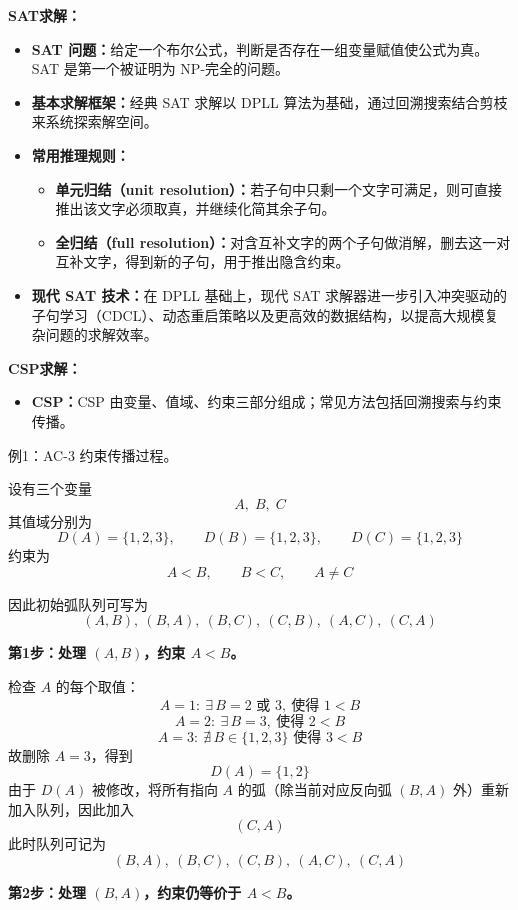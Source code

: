 \documentclass[../main.tex]{subfiles}
\begin{document}
\begin{enumerate}
\begin{itemize}
        \textbf{SAT求解：}
            \begin{itemize}
            \item \textbf{SAT 问题：}给定一个布尔公式，判断是否存在一组变量赋值使公式为真。SAT 是第一个被证明为 NP-完全的问题。
            \item \textbf{基本求解框架：}经典 SAT 求解以 DPLL 算法为基础，通过回溯搜索结合剪枝来系统探索解空间。
            \item \textbf{常用推理规则：}
            \begin{itemize}
                \item \textbf{单元归结（unit resolution）：}若子句中只剩一个文字可满足，则可直接推出该文字必须取真，并继续化简其余子句。
                \item \textbf{全归结（full resolution）：}对含互补文字的两个子句做消解，删去这一对互补文字，得到新的子句，用于推出隐含约束。
            \end{itemize}
            \item \textbf{现代 SAT 技术：}在 DPLL 基础上，现代 SAT 求解器进一步引入冲突驱动的子句学习（CDCL）、动态重启策略以及更高效的数据结构，以提高大规模复杂问题的求解效率。
        \end{itemize}

        \textbf{CSP求解：}
        \begin{itemize}
            \item \textbf{CSP：}CSP 由变量、值域、约束三部分组成；常见方法包括回溯搜索与约束传播。
        \end{itemize}
    \end{itemize}

    {\small\kaishu
例1：AC-3 约束传播过程。

设有三个变量
$$
A,\;B,\;C
$$
其值域分别为
$$
D(A)=\{1,2,3\},\qquad D(B)=\{1,2,3\},\qquad D(C)=\{1,2,3\}
$$
约束为
$$
A<B,\qquad B<C,\qquad A\neq C
$$

因此初始弧队列可写为
$$
(A,B),\ (B,A),\ (B,C),\ (C,B),\ (A,C),\ (C,A)
$$

\textbf{第1步：处理 $(A,B)$，约束 $A<B$。}

检查 $A$ 的每个取值：
$$
A=1:\ \exists\,B=2\text{ 或 }3,\ \text{使得 }1<B
$$
$$
A=2:\ \exists\,B=3,\ \text{使得 }2<B
$$
$$
A=3:\ \nexists\,B\in\{1,2,3\}\text{ 使得 }3<B
$$
故删除 $A=3$，得到
$$
D(A)=\{1,2\}
$$
由于 $D(A)$ 被修改，将所有指向 $A$ 的弧（除当前对应反向弧 $(B,A)$ 外）重新加入队列，因此加入
$$
(C,A)
$$
此时队列可记为
$$
(B,A),\ (B,C),\ (C,B),\ (A,C),\ (C,A)
$$

\textbf{第2步：处理 $(B,A)$，约束仍等价于 $A<B$。}

}
\end{enumerate}
\end{document}
